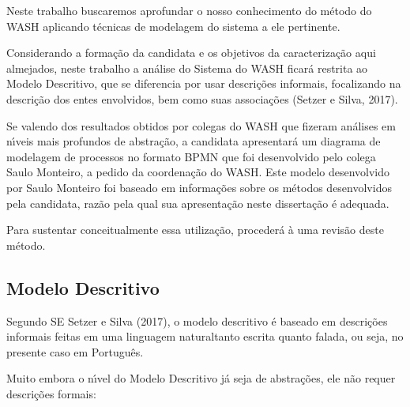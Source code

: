 \documentclass[
12pt,		%
openright,	%
twoside,  %
a4paper,			%
chapter=TITLE,		%
english,			%
french,				%
spanish,			%
brazil				%
]{USPSC-classe/USPSC_RedarTex}
\begin{document}
Neste trabalho buscaremos aprofundar o nosso conhecimento do m\'etodo do WASH aplicando t\'ecnicas de modelagem do sistema a ele pertinente.








Considerando a forma\c{c}\~ao da candidata e os objetivos da caracteriza\c{c}\~ao aqui almejados, neste trabalho a an\'alise do Sistema do WASH ficar\'a restrita ao Modelo Descritivo, que se diferencia por usar descri\c{c}\~oes informais, focalizando na descri\c{c}\~ao dos entes envolvidos, bem como suas associa\c{c}\~oes  (Setzer e Silva, 2017).








Se valendo dos resultados obtidos por colegas do WASH que fizeram an\'alises em n\'{\i}veis mais profundos de abstra\c{c}\~ao, a candidata apresentar\'a um diagrama de modelagem de processos no formato BPMN que foi desenvolvido pelo colega Saulo Monteiro, a pedido da coordena\c{c}\~ao do WASH. Este modelo desenvolvido por Saulo Monteiro foi baseado em informa\c{c}\~oes sobre os m\'etodos desenvolvidos pela candidata, raz\~ao pela qual sua apresenta\c{c}\~ao neste disserta\c{c}\~ao \'e adequada.








Para sustentar conceitualmente essa utiliza\c{c}\~ao, proceder\'a \`a uma revis\~ao deste m\'etodo.








\subsection[Modelo Descritivo]{Modelo Descritivo}\label{Modelo Descritivo}
Segundo SE Setzer e Silva (2017), o modelo descritivo \'e baseado em \textquotedbl descri\c{c}\~oes informais feitas em uma linguagem natural\textquotedbl  tanto escrita quanto falada, ou seja, no presente caso em Portugu\^es.








Muito embora o n\'{\i}vel do Modelo Descritivo j\'a seja de abstra\c{c}\~oes, ele n\~ao requer descri\c{c}\~oes formais:
\end{document}
